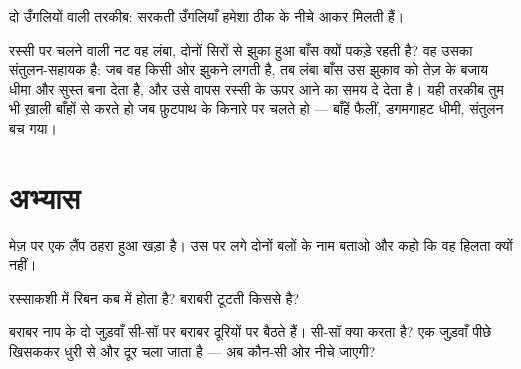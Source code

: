 \begin{omfigure}

{\small दो उँगलियों वाली तरकीब: सरकती उँगलियाँ हमेशा ठीक 
के नीचे आकर मिलती हैं।}
\end{omfigure}

\begin{example}[नट का बाँस]\label{ex:g2:balance-equilibrium:acrobat}
रस्सी पर चलने वाली नट वह लंबा, दोनों सिरों से झुका हुआ बाँस क्यों
पकड़े रहती है? वह उसका संतुलन-सहायक है: जब वह किसी ओर झुकने लगती है,
तब लंबा बाँस उस झुकाव को तेज़ के बजाय धीमा और सुस्त बना देता है, और
उसे वापस रस्सी के ऊपर आने का समय दे देता है। यही तरकीब तुम भी ख़ाली
बाँहों से करते हो जब फ़ुटपाथ के किनारे पर चलते हो --- बाँहें फैलीं,
डगमगाहट धीमी, संतुलन बच गया।
\end{example}

\section{अभ्यास}

\begin{exercise}[$\star$]\label{exo:g2:balance-equilibrium:1}
मेज़ पर एक लैंप ठहरा हुआ खड़ा है। उस पर लगे दोनों बलों के नाम बताओ
और कहो कि वह हिलता क्यों नहीं।
\end{exercise}

\begin{exercise}[$\star$]\label{exo:g2:balance-equilibrium:2}
रस्साकशी में रिबन कब  में होता है? बराबरी टूटती किससे है?
\end{exercise}

\begin{exercise}[$\star$]\label{exo:g2:balance-equilibrium:3}
बराबर नाप के दो जुड़वाँ सी-सॉ पर बराबर दूरियों पर बैठते हैं। सी-सॉ
क्या करता है? एक जुड़वाँ पीछे खिसककर धुरी से और दूर चला जाता है ---
अब कौन-सी ओर नीचे जाएगी?
\end{exercise}

